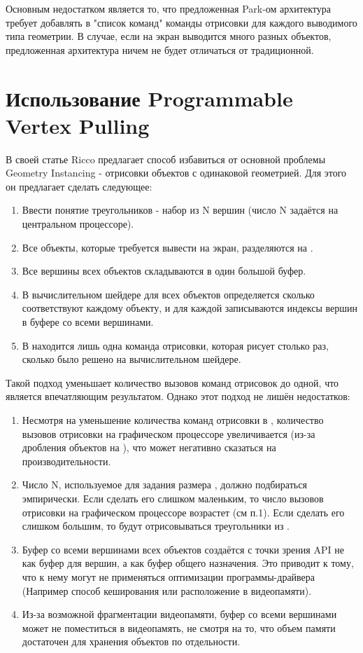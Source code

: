 	Основным недостатком является то, что предложенная Park-ом\cite{park2009fast} архитектура требует добавлять в "список команд" команды отрисовки для каждого выводимого типа геометрии. В случае, если на экран выводится много разных объектов, предложенная архитектура ничем не будет отличаться от традиционной.
	
\section{Использование Programmable Vertex Pulling}\label{ch2:Programmable-Vertex-Pulling} %
	В своей статье Ricco\cite{riccio2013introducing} предлагает способ избавиться от основной проблемы Geometry Instancing - отрисовки объектов с одинаковой геометрией. Для этого он предлагает сделать следующее:
	\begin{enumerate}[1.]
		\item Ввести понятие  треугольников - набор из N вершин (число N задаётся на центральном процессоре).
		\item Все объекты, которые требуется вывести на экран, разделяются на .
		\item Все вершины всех объектов складываются в один большой буфер.\label{vertex_big_buffer}
		\item В вычислительном шейдере для всех объектов определяется сколько  соответствуют каждому объекту, и для каждой  записываются индексы вершин в буфере со всеми вершинами. 
		\item В  находится лишь одна команда отрисовки, которая рисует  столько раз, сколько было решено на вычислительном шейдере.
	\end{enumerate}
	
	Такой подход уменьшает количество вызовов команд отрисовок до одной, что является впечатляющим результатом. Однако этот подход не лишён недостатков:
	\begin{enumerate}[1.]
		\item Несмотря на уменьшение количества команд отрисовки в , количество вызовов отрисовки на графическом процессоре увеличивается (из-за дробления объектов на ), что может негативно сказаться на производительности. 
		\item Число N, используемое для задания размера , должно подбираться эмпирически. Если сделать его слишком маленьким, то число вызовов отрисовки на графическом процессоре возрастет (см п.1). Если сделать его слишком большим, то будут отрисовываться  треугольники из .
		\item Буфер со всеми вершинами всех объектов создаётся с точки зрения API не как буфер для вершин, а как буфер общего назначения. Это приводит к тому, что к нему могут не применяться оптимизации программы-драйвера (Например способ кеширования или расположение в видеопамяти).
		\item Из-за возможной фрагментации видеопамяти, буфер со всеми вершинами может не поместиться в видеопамять, не смотря на то, что объем памяти достаточен для хранения объектов по отдельности.
	\end{enumerate}
		
